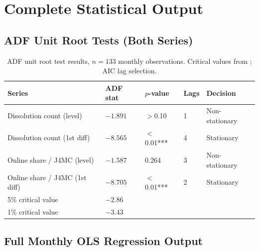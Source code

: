 \documentclass[12pt,a4paper]{article}
\begin{document}
\newpage



\newpage
\appendix

\section{Complete Statistical Output}
\label{app:stats}

\subsection{ADF Unit Root Tests (Both Series)}

\begin{table}[H]
\centering
\caption{ADF unit root test results, $n=133$ monthly observations.
Critical values from \citet{MacKinnon1994}; AIC lag selection.}
\small{}
\begin{tabular}{@{}L{5.5cm}C{2.0cm}C{2.0cm}C{1.0cm}L{2.5cm}@{}}
\toprule
{}\color{white}\textbf{Series} &
\color{white}\textbf{ADF stat} & \color{white}\textbf{$p$-value} &
\color{white}\textbf{Lags} & \color{white}\textbf{Decision} \\
\midrule
Dissolution count (level) & $-1.891$ & $>$0.10 & 1 & Non-stationary \\
Dissolution count (1st diff) & $-8.565$ & $<$0.01*** & 4 & Stationary \\
Online share / J4MC (level) & $-1.587$ & 0.264 & 3 & Non-stationary \\
Online share / J4MC (1st diff) & $-8.705$ & $<$0.01*** & 2 & Stationary \\
5\% critical value & $-2.86$ & & & \\
1\% critical value & $-3.43$ & & & \\
\bottomrule
\end{tabular}
\end{table}

\subsection{Full Monthly OLS Regression Output}
\end{document}
